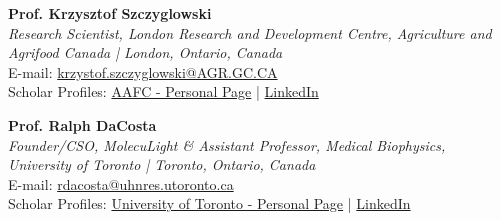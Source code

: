 \documentclass[a4paper,9pt]{extarticle}
\begin{document}
\begin{minipage}{1\textwidth}
\setlength{\parindent}{15pt} %
	\noindent
	\textbf{Prof. Krzysztof Szczyglowski}\\
	\textit{Research Scientist, London Research and Development Centre, Agriculture and Agrifood Canada | London, Ontario, Canada}\\
	E-mail: \href{mailto:krzystof.szczyglowski@AGR.GC.CA}{krzystof.szczyglowski@AGR.GC.CA}\\
	Scholar Profiles: \href{https://www.goc411.ca/en/7381/Krzysztof-Szczyglowski}{AAFC - Personal Page} | \href{https://www.linkedin.com/in/krzysztof-szczyglowski-28197552/}{LinkedIn}\\ 
\end{minipage}
\begin{minipage}{1\textwidth}
\setlength{\parindent}{15pt} %
	\noindent
	\textbf{Prof. Ralph DaCosta}\\
	\textit{Founder/CSO, MolecuLight \& Assistant Professor, Medical Biophysics, University of Toronto | Toronto, Ontario, Canada}\\
	E-mail: \href{mailto:rdacosta@uhnres.utoronto.ca}{rdacosta@uhnres.utoronto.ca}\\
	Scholar Profiles: \href{https://medbio.utoronto.ca/faculty/dacosta}{University of Toronto - Personal Page} | \href{https://www.linkedin.com/in/dr-ralph-dacosta-474b41127/}{LinkedIn}\\ \\
\end{minipage}
\end{document}
